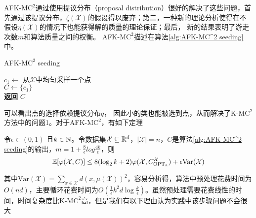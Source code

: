 AFK-M$\text{C}^2$\cite{bachem2016fast}通过使用提议分布（proposal distribution）很好的解决了这些问题，首先通过该提议分布，$\zeta(\mathcal{X})$的假设得以废弃；第二，一种新的理论分析使得在不假设$\eta(\mathcal{X})$的情况下也能获得解的质量的理论保证；最后， 新的结果表明了游走次数$m$和算法质量之间的权衡。 AFK-M$\text{C}^2$描述在算法\ref{alg:AFK-MC^2 seeding}中。
\begin{algorithm}
    \SetNoFillComment
    \caption{AFK-M$\text{C}^2$ seeding}\label{alg:AFK-MC^2 seeding}
    $c_1 \gets $ 从$\mathcal{X}$中均匀采样一个点 \\
    $C \gets \{c_1\}$ \\
    \textbf{返回} $C$
\end{algorithm}
可以看出点的选择依赖提议分布$q$， 因此小的类也能被选到点，从而解决了K-M$\text{C}^2$方法中的问题1。对于AFK-M$\text{C}^2$，有如下定理
\begin{theorem}
    \label{theo:AFKmc^2 performance}
    令$\epsilon \in (0,1)$ 且$k \in \mathbb{N}$。令数据集$\mathcal{X} \subseteq \mathbb{R}^d$，$|\mathcal{X}| = n$，$C$是算法\ref{alg:AFK-MC^2 seeding}的输出，$m = 1+\frac{8}{\epsilon}log \frac{4k}{\epsilon}$，则
    \begin{equation*}
    \mathbb{E}[\varphi(\mathcal{X},C)]\leq 8(\log_{2}k+2)\varphi(\mathcal{X},C_{\text{OPT}_k}^{\mathcal{X}}) + \epsilon\text{Var}(\mathcal{X})
    \end{equation*}
\end{theorem}
其中$\text{Var}(\mathcal{X})=\sum_{x \in  \mathcal{X}}d(x,\mu(\mathcal{X}))^2$，容易分析得，算法中预处理花费时间为$O(nd)$，主要循环花费时间为$O(\frac{1}{\epsilon}k^2 d\log \frac{k}{\epsilon})$。虽然预处理需要花费线性的时间，时间复杂度比K-M$\text{C}^2$高，但是我们有以下理由认为实践中该步骤问题不会很大
